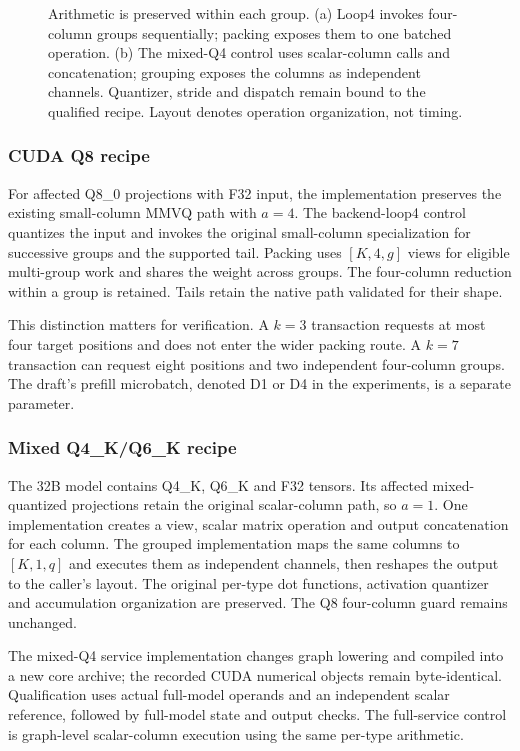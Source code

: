 \begin{figure}[t]
\centering
\caption{Arithmetic is preserved within each group. (a) Loop4 invokes four-column groups sequentially; packing exposes them to one batched operation. (b) The mixed-Q4 control uses scalar-column calls and concatenation; grouping exposes the columns as independent channels. Quantizer, stride and dispatch remain bound to the qualified recipe. Layout denotes operation organization, not timing.}
\label{fig:arithmetic}
\end{figure}

\subsubsection{CUDA Q8 recipe}
For affected Q8\_0 projections with F32 input, the implementation preserves the existing small-column MMVQ path with $a=4$. The backend-loop4 control quantizes the input and invokes the original small-column specialization for successive groups and the supported tail. Packing uses $[K, 4,g]$ views for eligible multi-group work and shares the weight across groups. The four-column reduction within a group is retained. Tails retain the native path validated for their shape.

This distinction matters for verification. A $k=3$ transaction requests at most four target positions and does not enter the wider packing route. A $k=7$ transaction can request eight positions and two independent four-column groups. The draft's prefill microbatch, denoted D1 or D4 in the experiments, is a separate parameter.

\subsubsection{Mixed Q4\_K/Q6\_K recipe}
The 32B model contains Q4\_K, Q6\_K and F32 tensors. Its affected mixed-quantized projections retain the original scalar-column path, so $a=1$. One implementation creates a view, scalar matrix operation and output concatenation for each column. The grouped implementation maps the same columns to $[K, 1,q]$ and executes them as independent channels, then reshapes the output to the caller's layout. The original per-type dot functions, activation quantizer and accumulation organization are preserved. The Q8 four-column guard remains unchanged.

The mixed-Q4 service implementation changes graph lowering and compiled into a new core archive; the recorded CUDA numerical objects remain byte-identical. Qualification uses actual full-model operands and an independent scalar reference, followed by full-model state and output checks. The full-service control is graph-level scalar-column execution using the same per-type arithmetic.

